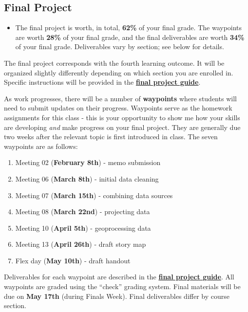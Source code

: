 \documentclass[
]{book}
\providecommand{\tightlist}{%
  \setlength{\itemsep}{0pt}\setlength{\parskip}{0pt}}
\newenvironment{rmdblock}[1]
  {\begin{shaded*}
  \begin{itemize}
  \renewcommand{\labelitemi}{
    \raisebox{-.7\height}[0pt][0pt]{
      {\setkeys{Gin}{width=3em,keepaspectratio}\texttt{[image: images/\#1]}}
    }
  }
  \item
  }
  {
  \end{itemize}
  \end{shaded*}
  }
\newenvironment{rmdtip}
  {\begin{rmdblock}{tip}}
  {\end{rmdblock}}
\begin{document}
\hypertarget{final-project}{%
\subsection{Final Project}\label{final-project}}

\begin{rmdtip}
The final project is worth, in total, \textbf{62\%} of your final grade.
The waypoints are worth \textbf{28\%} of your final grade, and the final
deliverables are worth \textbf{34\%} of your final grade. Deliverables
vary by section; see below for details.
\end{rmdtip}

The final project corresponds with the fourth learning outcome. It will be organized slightly differently depending on which section you are enrolled in. Specific instructions will be provided in the \href{https://slu-soc5650.github.io/final-project}{\textbf{final project guide}}.

As work progresses, there will be a number of \textbf{waypoints} where students will need to submit updates on their progress. Waypoints serve as the homework assignments for this class - this is your opportunity to show me how your skills are developing \emph{and} make progress on your final project. They are generally due two weeks after the relevant topic is first introduced in class. The seven waypoints are as follows:

\begin{enumerate}
\def\labelenumi{\arabic{enumi}.}
\tightlist
\item
  Meeting 02 (\textbf{February 8th}) - memo submission
\item
  Meeting 06 (\textbf{March 8th}) - initial data cleaning
\item
  Meeting 07 (\textbf{March 15th}) - combining data sources
\item
  Meeting 08 (\textbf{March 22nd}) - projecting data
\item
  Meeting 10 (\textbf{April 5th}) - geoprocessing data
\item
  Meeting 13 (\textbf{April 26th}) - draft story map
\item
  Flex day (\textbf{May 10th}) - draft handout
\end{enumerate}

Deliverables for each waypoint are described in the \href{https://slu-soc5650.github.io/final-project}{\textbf{final project guide}}. All waypoints are graded using the ``check'' grading system. Final materials will be due on \textbf{May 17th} (during Finals Week). Final deliverables differ by course section.
\end{document}
